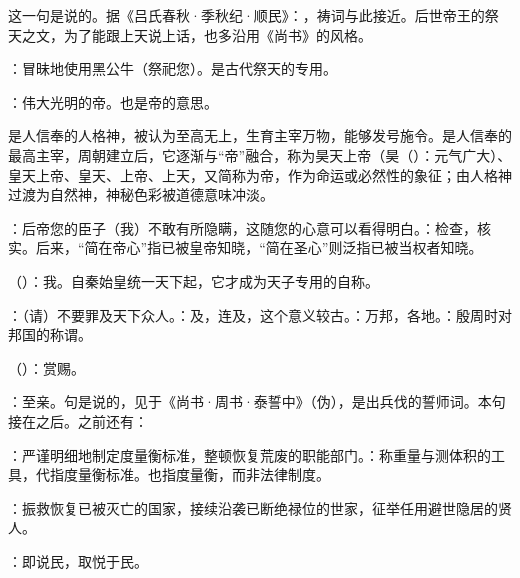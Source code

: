 {\begin{lyblobitemize}
这一句是说的。据《吕氏春秋·季秋纪·顺民》：，祷词与此接近。后世帝王的祭天之文，为了能跟上天说上话，也多沿用《尚书》的风格。

\item {}：冒昧地使用黑公牛（祭祀您）。是古代祭天的专用。
\item {}：伟大光明的帝。也是帝的意思。

是人信奉的人格神，被认为至高无上，生育主宰万物，能够发号施令。是人信奉的最高主宰，周朝建立后，它逐渐与“帝”融合，称为昊天上帝（昊（）：元气广大）、皇天上帝、皇天、上帝、上天，又简称为帝，作为命运或必然性的象征；由人格神过渡为自然神，神秘色彩被道德意味冲淡。

\item {}：后帝您的臣子（我）不敢有所隐瞒，这随您的心意可以看得明白。：检查，核实。后来，“简在帝心”指已被皇帝知晓，“简在圣心”则泛指已被当权者知晓。
\item {}（）：我。自秦始皇统一天下起，它才成为天子专用的自称。
\item {}：（请）不要罪及天下众人。：及，连及，这个意义较古。：万邦，各地。：殷周时对邦国的称谓。
\item {}（）：赏赐。
\item {}：至亲。句是说的，见于《尚书·周书·泰誓中》（伪），是出兵伐的誓师词。本句接在之后。之前还有：

\item {}：严谨明细地制定度量衡标准，整顿恢复荒废的职能部门。：称重量与测体积的工具，代指度量衡标准。也指度量衡，而非法律制度。

\item {}：振救恢复已被灭亡的国家，接续沿袭已断绝禄位的世家，征举任用避世隐居的贤人。%
\item {}：即说民，取悦于民。
\end{lyblobitemize}
}
{}


